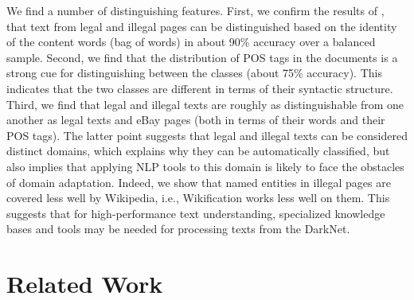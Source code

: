 \documentclass[11pt,a4paper,table]{article}
\begin{document}
  We find a number of distinguishing features. First, we confirm the results of \citet{Avarikioti18}, 
	that text from legal and illegal pages can be distinguished based on the identity of the content words (bag of words) 
  in about 90\% accuracy over a balanced sample. Second, we find that the distribution of POS tags in the documents is a strong cue for 
	distinguishing between the classes (about 75\% accuracy). This indicates that the two classes are different in 
	terms of their syntactic structure. Third, we find that legal and illegal texts are roughly as distinguishable from one another as legal 
	texts and eBay pages (both in terms of their words and their POS tags). 
	The latter point suggests that legal and illegal texts can be considered distinct domains, which explains why they can be 
	automatically classified, but also implies that applying NLP tools to this domain is likely to face the obstacles of domain adaptation.  
  Indeed, we show that named entities in illegal pages are covered less well by Wikipedia, i.e., Wikification works less well on them.
  This suggests that for high-performance text understanding, specialized knowledge bases and tools may be needed for processing texts from the DarkNet.
  
  
	
%   
%   
%   
%
%
%
%

\section{Related Work}
\end{document}
